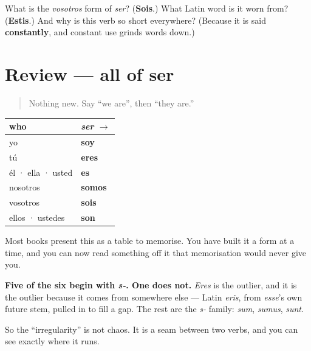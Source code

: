 \begin{tcolorbox}[breakable,colback=teal!4,colframe=teal!35!black,title={Before you move on}]
What is the \emph{vosotros} form of \emph{ser}? (\textbf{Sois}.) What Latin word is it worn from? (\textbf{Estis}.) And why is this verb so short everywhere? (Because it is said \textbf{constantly}, and constant use grinds words down.)
\end{tcolorbox}
\section[Practice]{Review — all of ser}

\label{lesson:ES-C09-repaso-ser}



\begin{quote}
Nothing new. Say \textquotedblleft{}we are\textquotedblright{}, then \textquotedblleft{}they are.\textquotedblright{}
\end{quote}

\begin{grammarlens}[title={Grammar Lens: the table, and why it looks like that}]
\noindent
\begin{tabularx}{\linewidth}{@{}>{\raggedright\arraybackslash}X>{\raggedright\arraybackslash}X@{}}
\toprule
\textbf{who} & \textbf{\emph{ser} $\to$} \\
\midrule
yo & \textbf{soy} \\
tú & \textbf{eres} \\
él · ella · usted & \textbf{es} \\
nosotros & \textbf{somos} \\
vosotros & \textbf{sois} \\
ellos · ustedes & \textbf{son} \\
\bottomrule
\end{tabularx}

Most books present this as a table to memorise. You have built it a form at a time, and you can now read something off it that memorisation would never give you.

\textbf{Five of the six begin with \emph{s-}. One does not.} \emph{Eres} is the outlier, and it is the outlier because it comes from somewhere else — Latin \emph{eris}, from \emph{esse}'s own future stem, pulled in to fill a gap. The rest are the \emph{s-} family: \emph{sum}, \emph{sumus}, \emph{sunt}.

So the \textquotedblleft{}irregularity\textquotedblright{} is not chaos. It is a seam between two verbs, and you can see exactly where it runs.
\end{grammarlens}

